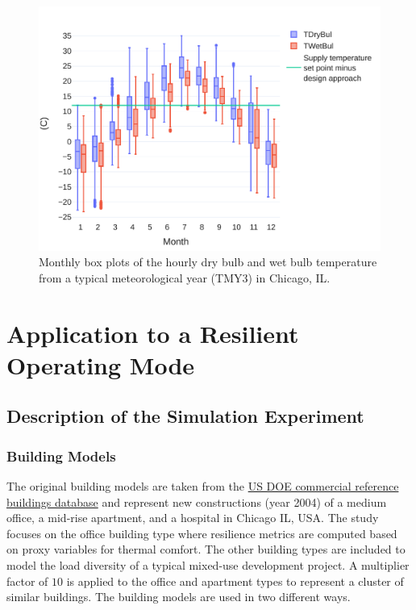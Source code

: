\begin{figure}[!htbp]
    \centering
    \includegraphics[width=.7\linewidth]{../python_scripts/figures/weather_stats.pdf}
    \caption{Monthly box plots of the hourly dry bulb and wet bulb temperature from a typical meteorological year (TMY3) in Chicago, IL.}
    \label{fig:weather_stats}
\end{figure}


\section{Application to a Resilient Operating Mode} \label{sec:application}

\subsection{Description of the Simulation Experiment} \label{sec:experiment}

\subsubsection{Building Models} \label{sec:buildings}

The original building models are taken from the \href{https://www.energy.gov/eere/buildings/commercial-reference-buildings}{US DOE commercial reference buildings database} and represent new constructions (year 2004) of a medium office, a mid-rise apartment, and a hospital in Chicago IL, USA.
The study focuses on the office building type where resilience metrics are computed based on proxy variables for thermal comfort. The other building types are included to model the load diversity of a typical mixed-use development project.
A multiplier factor of $10$ is applied to the office and apartment types to represent a cluster of similar buildings.
The building models are used in two different ways.

